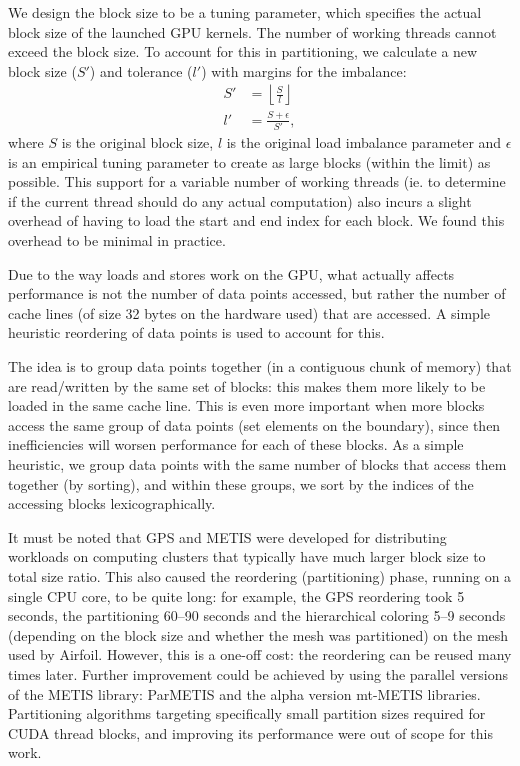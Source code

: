 We design the block size to be a tuning parameter, which specifies the actual
block size of the launched GPU kernels. The number of working threads
cannot exceed the block size. To account for this in partitioning, we calculate 
a new block size ($S'$) and tolerance ($l'$) with margins for the imbalance:
\begin{align}
  S' &= \left\lfloor \frac{S}{l} \right\rfloor \\
  l' &= \frac{S + \epsilon}{S'},
\end{align}
where $S$ is the original block size, $l$ is the original load imbalance
parameter and $\epsilon$ is an empirical tuning parameter to create as large
blocks (within the limit) as possible. This support for a variable number of 
working threads (ie. to determine if the current thread should do any actual 
computation) also incurs a slight overhead of having to load the start and end 
index for each block. We found this overhead to be minimal in practice.

Due to the way loads and stores work on the GPU, what actually affects
performance is not the number of data points accessed, but rather the number of
cache lines (of size 32 bytes on the hardware used) that are accessed. A simple 
heuristic reordering of data points is used to account for this. 

The idea is to group data points together (in a contiguous chunk of memory)
that are read/written by the same set of blocks: this makes them more likely to
be loaded in the same cache line. This is even more important when more blocks
access the same group of data points (set elements on the boundary), since then
inefficiencies will worsen performance for each of these blocks. As a simple
heuristic, we group data points with the same number of blocks that access them
together (by sorting), and within these groups, we sort by the indices of the
accessing blocks lexicographically.

It must be noted that GPS and METIS were developed for distributing workloads on
computing clusters that typically have much larger block size to total size
ratio. This also caused the reordering (partitioning) phase, running on a 
single CPU core, to be quite long: for example, the GPS reordering took 5 
seconds, the partitioning 60--90 seconds and the hierarchical coloring 5--9 
seconds (depending on the block size and whether the mesh was partitioned) on 
the mesh used by Airfoil. However, this is a one-off cost: the reordering can 
be reused many times later. Further improvement could be achieved by using the 
parallel versions of the METIS library: ParMETIS\cite{parmetis} and the alpha 
version mt-METIS\cite{mtmetis} libraries. Partitioning algorithms targeting 
specifically small partition sizes required for CUDA thread blocks, and 
improving its performance were out of scope for this work.

